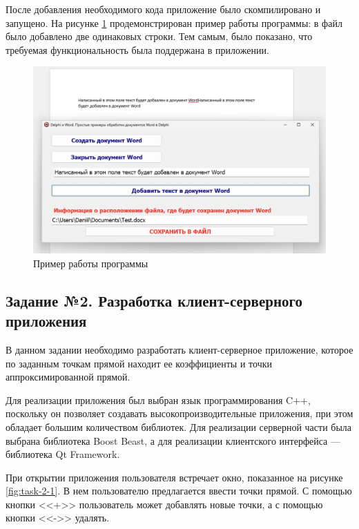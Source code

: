 \documentclass[a4paper, 14pt]{extarticle}
\begin{document}
После добавления необходимого кода приложение было скомпилировано и запущено. На
рисунке \ref{fig:task-1-3} продемонстрирован пример работы программы: в файл
было добавлено две одинаковых строки. Тем самым, было показано, что требуемая
функциональность была поддержана в приложении.

\begin{figure}[H]
  \centering
  \includegraphics[width=\textwidth]{images/task-1/3.png}
  \caption{Пример работы программы}
  \label{fig:task-1-3}
\end{figure}

\subsection*{Задание №2. Разработка клиент-серверного приложения}

В данном задании необходимо разработать клиент-серверное приложение, которое по
заданным точкам прямой находит ее коэффициенты и точки аппроксимированной
прямой.

Для реализации приложения был выбран язык программирования C++, поскольку он
позволяет создавать высокопроизводительные приложения, при этом обладает большим
количеством библиотек. Для реализации серверной части была выбрана библиотека
\foreignlanguage{english}{Boost Beast}, а для реализации клиентского интерфейса
--- библиотека \foreignlanguage{english}{Qt Framework}.

При открытии приложения пользователя встречает окно, показанное на рисунке
\ref{fig:task-2-1}. В нем пользователю предлагается ввести точки прямой. С
помощью кнопки <<+>> пользователь может добавлять новые точки, а с помощью
кнопки <<->> удалять.
\end{document}
